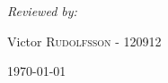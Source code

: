 \documentclass[12pt]{article} %
\begin{document}
\begin{titlepage}
\begin{minipage}{0.44\textwidth}
\emph{Reviewed by:}\\
\begin{myfont}
Victor \textsc{Rudolfsson} - 120912\\ %
\end{myfont}

\end{minipage}

\vfill %
{\large \today}\\[3cm] %

\end{titlepage}




\newpage





\end{document}
